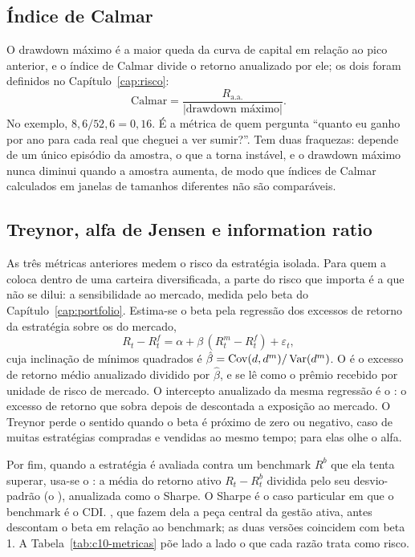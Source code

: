 \subsection{Índice de Calmar}

O drawdown máximo é a maior queda da curva de capital em relação ao pico anterior, e o índice de Calmar \citep{young1991} divide o retorno anualizado por ele; os dois foram definidos no Capítulo~\ref{cap:risco}:
\begin{equation}
  \text{Calmar} = \frac{R_{\text{a.a.}}}{\lvert \text{drawdown máximo} \rvert} .
  \label{eq:c10-calmar}
\end{equation}
No exemplo, $8,6/52,6 = 0,16$. É a métrica de quem pergunta ``quanto eu ganho por ano para cada real que cheguei a ver sumir?''. Tem duas fraquezas: depende de um único episódio da amostra, o que a torna instável, e o drawdown máximo nunca diminui quando a amostra aumenta, de modo que índices de Calmar calculados em janelas de tamanhos diferentes não são comparáveis.

\subsection{Treynor, alfa de Jensen e information ratio}

As três métricas anteriores medem o risco da estratégia isolada. Para quem a coloca dentro de uma carteira diversificada, a parte do risco que importa é a que não se dilui: a sensibilidade ao mercado, medida pelo beta do Capítulo~\ref{cap:portfolio}. Estima-se o beta pela regressão dos excessos de retorno da estratégia sobre os do mercado,
\begin{equation}
  R_t - R^f_t = \alpha + \beta\,(R^m_t - R^f_t) + \varepsilon_t ,
  \label{eq:c10-regressao}
\end{equation}
cuja inclinação de mínimos quadrados é $\hat\beta = \operatorname{Cov}(d, d^m)/\operatorname{Var}(d^m)$. O  \citep{treynor1965} é o excesso de retorno médio anualizado dividido por $\hat\beta$, e se lê como o prêmio recebido por unidade de risco de mercado. O intercepto anualizado da mesma regressão é o  \citep{jensen1968}: o excesso de retorno que sobra depois de descontada a exposição ao mercado. O Treynor perde o sentido quando o beta é próximo de zero ou negativo, caso de muitas estratégias compradas e vendidas ao mesmo tempo; para elas olhe o alfa.

Por fim, quando a estratégia é avaliada contra um benchmark $R^b$ que ela tenta superar, usa-se o : a média do retorno ativo $R_t - R^b_t$ dividida pelo seu desvio-padrão (o ), anualizada como o Sharpe. O Sharpe é o caso particular em que o benchmark é o CDI. \citet{grinold2000}, que fazem dela a peça central da gestão ativa, antes descontam o beta em relação ao benchmark; as duas versões coincidem com beta 1. A Tabela~\ref{tab:c10-metricas} põe lado a lado o que cada razão trata como risco.

